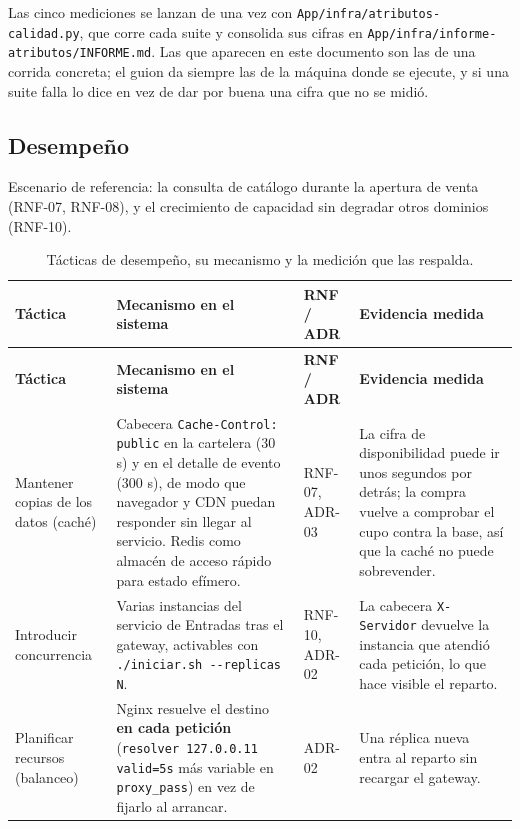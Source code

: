 \documentclass[11pt,a4paper]{article}
\begin{document}
Las cinco mediciones se lanzan de una vez con \texttt{App/infra/atributos-calidad.py}, que corre
cada suite y consolida sus cifras en \texttt{App/infra/informe-atributos/INFORME.md}. Las que
aparecen en este documento son las de una corrida concreta; el guion da siempre las de la máquina
donde se ejecute, y si una suite falla lo dice en vez de dar por buena una cifra que no se midió.

\subsection{Desempeño}

Escenario de referencia: la consulta de catálogo durante la apertura de venta (RNF-07, RNF-08),
y el crecimiento de capacidad sin degradar otros dominios (RNF-10).

\begin{center}
\begin{longtable}{|>{\raggedright\arraybackslash}p{2.9cm}|>{\raggedright\arraybackslash}p{5.1cm}|>{\raggedright\arraybackslash}p{1.7cm}|>{\raggedright\arraybackslash}p{3.7cm}|}
\caption{Tácticas de desempeño, su mecanismo y la medición que las respalda.}\label{tab:tacticas-desempeno}\\
\hline
\textbf{Táctica} & \textbf{Mecanismo en el sistema} & \textbf{RNF / ADR} & \textbf{Evidencia medida}\\
\hline
\endfirsthead
\hline
\textbf{Táctica} & \textbf{Mecanismo en el sistema} & \textbf{RNF / ADR} & \textbf{Evidencia medida}\\
\hline
\endhead

Mantener copias de los datos (caché) &
Cabecera \texttt{Cache-Control: public} en la cartelera (30 s) y en el detalle de evento (300 s),
de modo que navegador y CDN puedan responder sin llegar al servicio. Redis como almacén de acceso
rápido para estado efímero. &
RNF-07, ADR-03 &
La cifra de disponibilidad puede ir unos segundos por detrás; la compra vuelve a comprobar el cupo
contra la base, así que la caché no puede sobrevender.\\
\hline

Introducir concurrencia &
Varias instancias del servicio de Entradas tras el gateway, activables con
\texttt{./iniciar.sh -{}-replicas N}. &
RNF-10, ADR-02 &
La cabecera \texttt{X-Servidor} devuelve la instancia que atendió cada petición, lo que hace
visible el reparto.\\
\hline

Planificar recursos (balanceo) &
Nginx resuelve el destino \textbf{en cada petición} (\texttt{resolver 127.0.0.11 valid=5s} más
variable en \texttt{proxy\_pass}) en vez de fijarlo al arrancar. &
ADR-02 &
Una réplica nueva entra al reparto sin recargar el gateway.\\
\hline


\end{longtable}
\end{center}
\end{document}
